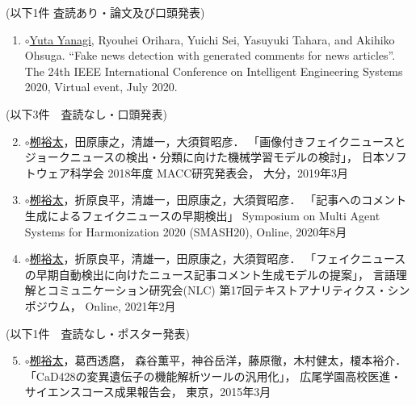 (以下1件 査読あり・論文及び口頭発表)
\vspace{-4mm}
\begin{enumerate}
    \setlength{\parskip}{0cm}
    \setlength{\itemsep}{0cm}
    \item \underline{$\circ$Yuta Yanagi}, Ryouhei Orihara, Yuichi Sei, Yasuyuki Tahara, and Akihiko Ohsuga.
    ``Fake news detection with generated comments for news articles''.
    The 24th IEEE International Conference on Intelligent Engineering Systems 2020,
    Virtual event, July 2020. \label{enum:ines}
\end{enumerate}
\vspace{-3mm}
(以下3件　査読なし・口頭発表)
\vspace{-3mm}
\begin{enumerate}
    \setcounter{enumi}{1}
    \setlength{\parskip}{0cm}
    \setlength{\itemsep}{0cm}
    \item \underline{$\circ$栁裕太}，田原康之，清雄一，大須賀昭彦．
        「画像付きフェイクニュースとジョークニュースの検出・分類に向けた機械学習モデルの検討」，
        日本ソフトウェア科学会 2018年度 MACC研究発表会，
        大分，2019年3月 \label{enum:MACC}
    \item \underline{$\circ$栁裕太}，折原良平，清雄一，田原康之，大須賀昭彦．
        「記事へのコメント生成によるフェイクニュースの早期検出」
        Symposium on Multi Agent Systems for Harmonization 2020 (SMASH20), Online, 2020年8月 \label{enum:SMASH}
    \item \underline{$\circ$栁裕太}，折原良平，清雄一，田原康之，大須賀昭彦．
        「フェイクニュースの早期自動検出に向けたニュース記事コメント生成モデルの提案」，
        言語理解とコミュニケーション研究会(NLC) 第17回テキストアナリティクス・シンポジウム，
        Online, 2021年2月 \label{enum:NLC}
\end{enumerate}
\vspace{-3mm}
(以下1件　査読なし・ポスター発表)
\vspace{-3mm}
\begin{enumerate}
    \setcounter{enumi}{4}
    \setlength{\parskip}{0cm}
    \setlength{\itemsep}{0cm}
    \item \underline{$\circ$栁裕太}，葛西透麿， 森谷薫平，神谷岳洋，藤原徹，木村健太，榎本裕介．
        「CaD428の変異遺伝子の機能解析ツールの汎用化」，
        広尾学園高校医進・サイエンスコース成果報告会，
        東京，2015年3月 \label{enum:hg}
\end{enumerate}
